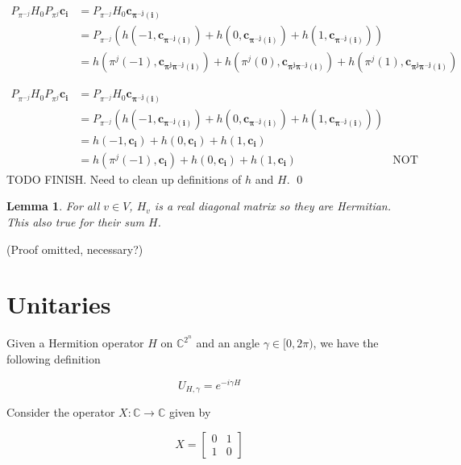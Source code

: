 \documentclass[10pt]{article}
\newtheorem{lemma}{Lemma}
\begin{document}
\begin{align*}
    P_{\pi^{-j}} H_0 P_{\pi^j}\boldsymbol{c_i} &=  P_{\pi^{-j}} H_0 \boldsymbol{c_{\pi^{-j}(i)}}\\
    &= P_{\pi^{-j}} (h(-1, \boldsymbol{c_{\pi^{-j}(i)}}) + h(0, \boldsymbol{c_{\pi^{-j}(i)}}) + h(1,\boldsymbol{c_{\pi^{-j}(i)}})) \\
     &= h(\pi^{j}(-1), \boldsymbol{c_{\pi^{j}\pi^{-j}(i)}}) + h(\pi^{j}(0), \boldsymbol{c_{\pi^{j}\pi^{-j}(i)}}) +
     h(\pi^{j}(1), \boldsymbol{c_{\pi^{j}\pi^{-j}(i)}})
\end{align*}

\begin{align*}
    P_{\pi^{-j}} H_0 P_{\pi^j}\boldsymbol{c_i} &=  P_{\pi^{-j}} H_0 \boldsymbol{c_{\pi^{-j}(i)}}\\
    &= P_{\pi^{-j}} (h(-1, \boldsymbol{c_{\pi^{-j}(i)}}) + h(0, \boldsymbol{c_{\pi^{-j}(i)}}) + h(1,\boldsymbol{c_{\pi^{-j}(i)}})) \\
    &= h(-1, \boldsymbol{c_i}) + h(0, \boldsymbol{c_i}) +
     h(1, \boldsymbol{c_i}) \\
     &= h(\pi^{j}(-1), \boldsymbol{c_i}) + h(0, \boldsymbol{c_i}) +
     h(1, \boldsymbol{c_i}) &\text{NOT CLEAR ENOUGH}
\end{align*}
TODO FINISH. Need to clean up definitions of $h$ and $H$. \qed

\begin{lemma}
For all $v \in V$, $H_v$ is a real diagonal matrix so they are Hermitian. This also true for their sum $H$.
\end{lemma}
(Proof omitted, necessary?)

\section*{Unitaries}
Given a Hermition operator $H$ on $\mathbb{C}^{2^n}$ and an angle $\gamma \in [0,2 \pi)$, we have the following definition

\begin{equation}
    U_{H, \gamma} = e^{-i \gamma H}
\end{equation}

Consider the operator $X : \mathbb{C} \rightarrow \mathbb{C}$ given by 

\begin{equation}
    X = \begin{bmatrix}
        0 & 1 \\
        1 & 0
    \end{bmatrix}
\end{equation}
\end{document}
